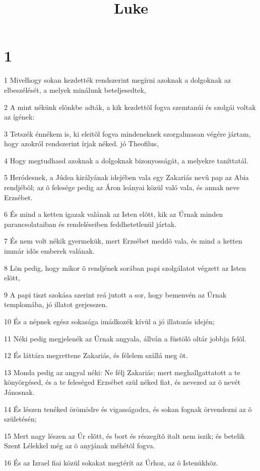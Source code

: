 

\title{Luke}


\chapter{1}

\par 1 Mivelhogy sokan kezdették rendszerint megírni azoknak a dolgoknak az elbeszélését, a melyek minálunk beteljesedtek,
\par 2 A mint nékünk elõnkbe adták, a kik kezdettõl fogva szemtanúi és szolgái voltak az ígének:
\par 3 Tetszék énnékem is, ki eleitõl fogva mindeneknek szorgalmasan végére jártam, hogy azokról rendszerint írjak néked. jó Theofilus,
\par 4 Hogy megtudhasd azoknak a dolgoknak bizonyosságát, a melyekre taníttatál.
\par 5 Heródesnek, a Júdea királyának idejében vala egy Zakariás nevû pap az Abia rendjébõl; az õ felesége pedig az Áron leányai közül való vala, és annak neve Erzsébet.
\par 6 És mind a ketten igazak valának az Isten elõtt, kik az Úrnak minden parancsolataiban és rendeléseiben feddhetetlenül jártak.
\par 7 És nem volt nékik gyermekük, mert Erzsébet meddõ vala, és mind a ketten immár idõs emberek valának.
\par 8 Lõn pedig, hogy mikor õ rendjének sorában papi szolgálatot végzett az Isten elõtt,
\par 9 A papi tiszt szokása szerint reá jutott a sor, hogy bemenvén az Úrnak templomába, jó illatot gerjesszen.
\par 10 És a népnek egész sokasága imádkozék kívül a jó illatozás idején;
\par 11 Néki pedig megjelenék az Úrnak angyala, állván a füstölõ oltár jobbja felõl.
\par 12 És láttára megrettene Zakariás, és félelem szállá meg õt.
\par 13 Monda pedig az angyal néki: Ne félj Zakariás; mert meghallgattatott a te könyörgésed, és a te feleséged Erzsébet szül néked fiat, és nevezed az õ nevét Jánosnak.
\par 14 És lészen tenéked örömödre és vigasságodra, és sokan fognak örvendezni az õ születésén;
\par 15 Mert nagy lészen az Úr elõtt, és bort és részegítõ italt nem iszik; és betelik Szent Lélekkel még az õ anyjának méhétõl fogva.
\par 16 És az Izrael fiai közül sokakat megtérít az Úrhoz, az õ Istenükhöz.
